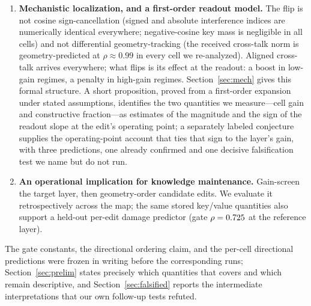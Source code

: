 \documentclass[preprint,12pt]{elsarticle}
\theoremstyle{definition}
\begin{document}
\begin{enumerate}
constructiveness remain.
\item \textbf{Mechanistic localization, and a first-order readout model.} The flip is not
cosine sign-cancellation (signed
and absolute interference indices are numerically identical everywhere; negative-cosine key
mass is negligible in all cells) and not differential geometry-tracking (the received
cross-talk norm is geometry-predicted at $\rho\approx0.99$ in every cell we re-analyzed).
Aligned
cross-talk arrives everywhere; what flips is its effect at the readout: a boost in
low-gain regimes, a penalty in high-gain regimes. Section~\ref{sec:mech} gives this
formal structure. A short proposition, proved from a first-order expansion under stated
assumptions, identifies the two quantities we measure---cell gain and constructive
fraction---as estimates of the magnitude and the sign of the readout slope at the edit's
operating point; a separately labeled conjecture supplies the operating-point account
that ties that sign to the layer's gain, with three predictions, one already confirmed
and one decisive falsification test we name but do not run.
\item \textbf{An operational implication for knowledge maintenance.} Gain-screen the target layer, then geometry-order
candidate edits. We evaluate it retrospectively across the map; the same stored key/value
quantities also support a held-out per-edit damage predictor (gate $\rho=0.725{}$
at the reference layer).
\end{enumerate}

The gate constants, the directional ordering claim, and the per-cell directional
predictions were frozen in writing before the corresponding runs; Section~\ref{sec:prelim}
states precisely which quantities that covers and which remain descriptive, and
Section~\ref{sec:falsified} reports the intermediate interpretations that our own
follow-up tests refuted.
\end{document}
